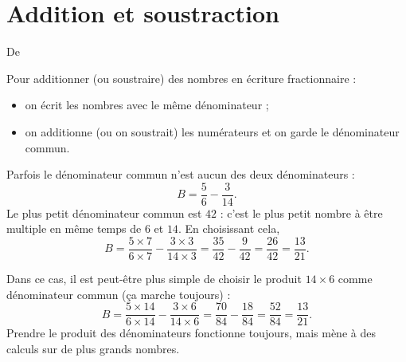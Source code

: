

\section{Addition et soustraction}


De \cite{NRHooXFvgpp4}

\begin{Aretenir}
    Pour additionner (ou soustraire) des nombres en écriture fractionnaire :
    \begin{itemize}
        \item 
            on écrit les nombres avec le même dénominateur ;
        \item 
            on additionne (ou on soustrait) les numérateurs et on garde le dénominateur commun.
    \end{itemize}
\end{Aretenir}

\begin{example}
    Parfois le dénominateur commun n'est aucun des deux dénominateurs :
    \begin{equation}
        B=\frac{5}{ 6 }-\frac{ 3 }{ 14 }.
    \end{equation}
    Le plus petit dénominateur commun est \( 42\) : c'est le plus petit nombre à être multiple en même temps de \( 6\) et \( 14\). En choisissant cela,
    \begin{equation}
        B=\frac{ 5\times 7 }{ 6\times 7 }-\frac{ 3\times 3 }{ 14\times 3 }=\frac{ 35 }{ 42 }-\frac{ 9 }{ 42 }=\frac{ 26 }{ 42 }=\frac{ 13 }{ 21 }.
    \end{equation}
    
    Dans ce cas, il est peut-être plus simple de choisir le produit \( 14\times 6\) comme dénominateur commun (ça marche toujours) :
    \begin{equation}
        B=\frac{ 5\times 14 }{ 6\times 14 }-\frac{ 3\times 6 }{ 14\times 6 }=\frac{ 70 }{ 84 }-\frac{ 18 }{ 84 }=\frac{ 52 }{ 84 }=\frac{ 13 }{ 21 }.
    \end{equation}
    Prendre le produit des dénominateurs fonctionne toujours, mais mène à des calculs sur de plus grands nombres.    
\end{example}


